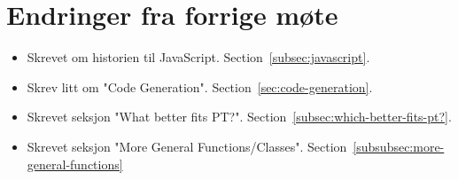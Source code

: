 
\chapter*{Endringer fra forrige møte}

\begin{itemize}
    \item Skrevet om historien til JavaScript.
    Section~\vref{subsec:javascript}.
    \item Skrev litt om "Code Generation".
    Section~\vref{sec:code-generation}.
    \item Skrevet seksjon "What better fits PT?".
    Section~\vref{subsec:which-better-fits-pt?}.
    \item Skrevet seksjon "More General Functions/Classes".
    Section~\vref{subsubsec:more-general-functions}
\end{itemize}

